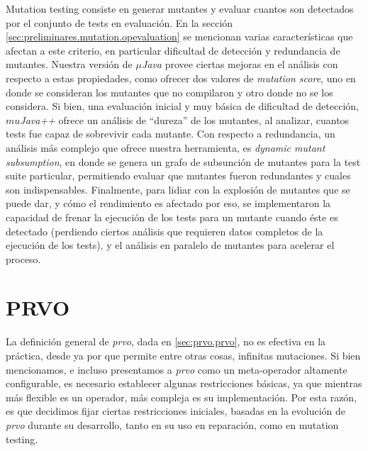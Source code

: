Mutation testing consiste en generar mutantes y evaluar cuantos son detectados por el conjunto de tests en evaluaci\'on. En la secci\'on \ref{sec:preliminares.mutation.opevaluation} se mencionan varias caracter\'isticas que afectan a este criterio, en particular dificultad de detecci\'on y redundancia de mutantes. Nuestra versi\'on de \emph{$\mu$Java} provee ciertas mejoras en el an\'alisis con respecto a estas propiedades, como ofrecer dos valores de \emph{mutation score}, uno en donde se consideran los mutantes que no compilaron y otro donde no se los considera. Si bien, una evaluaci\'on inicial y muy b\'asica de dificultad de detecci\'on, \emph{$mu$Java++} ofrece un an\'alisis de ``dureza'' de los mutantes, al analizar, cuantos tests fue capaz de sobrevivir cada mutante. Con respecto a redundancia, un an\'alisis m\'as complejo que ofrece nuestra herramienta, es \emph{dynamic mutant subsumption}, en donde se genera un grafo de subsunci\'on de mutantes para la test suite particular, permitiendo evaluar que mutantes fueron redundantes y cuales son indispensables. Finalmente, para lidiar con la explosi\'on de mutantes que se puede dar, y c\'omo el rendimiento es afectado por eso, se implementaron la capacidad de frenar la ejecuci\'on de los tests para un mutante cuando \'este es detectado (perdiendo ciertos an\'alisis que requieren datos completos de la ejecuci\'on de los tests), y el an\'alisis en paralelo de mutantes para acelerar el proceso.

\section{PRVO}
\label{sec:implementation.prvo}

La definici\'on general de \emph{prvo}, dada en \ref{sec:prvo.prvo}, no es efectiva en la pr\'actica, desde ya por que permite entre otras cosas, infinitas mutaciones. Si bien mencionamos, e incluso presentamos a \emph{prvo} como un meta-operador altamente configurable, es necesario establecer algunas restricciones b\'asicas, ya que mientras m\'as flexible es un operador, m\'as compleja es su implementaci\'on. Por esta raz\'on, es que decidimos fijar ciertas restricciones iniciales, basadas en la evoluci\'on de \emph{prvo} durante su desarrollo, tanto en su uso en reparaci\'on, como en mutation testing.

